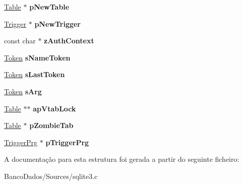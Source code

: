 \begin{DoxyCompactItemize}
\item 
\hypertarget{struct_parse_a4788769c077dc86ffa3ee1e40ed6b4a1}{\hyperlink{struct_table}{Table} $\ast$ {\bfseries p\-New\-Table}}\label{struct_parse_a4788769c077dc86ffa3ee1e40ed6b4a1}

\item 
\hypertarget{struct_parse_a92ea8f2ac3190dd7c8360e0334ae78b3}{\hyperlink{struct_trigger}{Trigger} $\ast$ {\bfseries p\-New\-Trigger}}\label{struct_parse_a92ea8f2ac3190dd7c8360e0334ae78b3}

\item 
\hypertarget{struct_parse_a12c6e2fb69848bcc57169d44993c351f}{const char $\ast$ {\bfseries z\-Auth\-Context}}\label{struct_parse_a12c6e2fb69848bcc57169d44993c351f}

\item 
\hypertarget{struct_parse_afd929c54566cfc4d6f748fcc6b79b973}{\hyperlink{struct_token}{Token} {\bfseries s\-Name\-Token}}\label{struct_parse_afd929c54566cfc4d6f748fcc6b79b973}

\item 
\hypertarget{struct_parse_ad499020d1bf06f3c98c8d36e2ceb83fd}{\hyperlink{struct_token}{Token} {\bfseries s\-Last\-Token}}\label{struct_parse_ad499020d1bf06f3c98c8d36e2ceb83fd}

\item 
\hypertarget{struct_parse_aa3fe38b31dd1cd0fbea4de0e77891642}{\hyperlink{struct_token}{Token} {\bfseries s\-Arg}}\label{struct_parse_aa3fe38b31dd1cd0fbea4de0e77891642}

\item 
\hypertarget{struct_parse_acdfd318c0f04ec640d6affc85ef8a009}{\hyperlink{struct_table}{Table} $\ast$$\ast$ {\bfseries ap\-Vtab\-Lock}}\label{struct_parse_acdfd318c0f04ec640d6affc85ef8a009}

\item 
\hypertarget{struct_parse_a4e8319f0a7f0d21e472c13ac6cf67060}{\hyperlink{struct_table}{Table} $\ast$ {\bfseries p\-Zombie\-Tab}}\label{struct_parse_a4e8319f0a7f0d21e472c13ac6cf67060}

\item 
\hypertarget{struct_parse_a0891dbd3b583594c5d07d7b061026ea4}{\hyperlink{struct_trigger_prg}{Trigger\-Prg} $\ast$ {\bfseries p\-Trigger\-Prg}}\label{struct_parse_a0891dbd3b583594c5d07d7b061026ea4}

\end{DoxyCompactItemize}


A documentação para esta estrutura foi gerada a partir do seguinte ficheiro\-:\begin{DoxyCompactItemize}
\item 
Banco\-Dados/\-Sources/sqlite3.\-c\end{DoxyCompactItemize}
